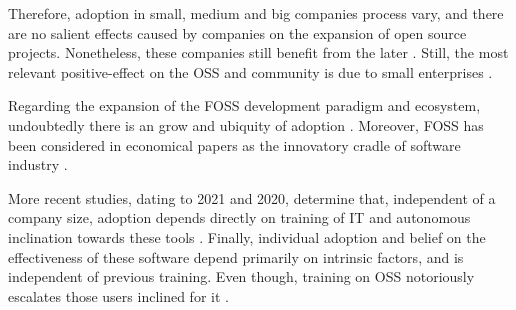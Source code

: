 \documentclass[
12pt,				%
openright,			%
oneside,			%
a4paper,			%
brazil,				%
english,			%
]{abntex2}
\begin{document}

Therefore, adoption in small, medium and big companies process vary,
and there are no salient effects caused by companies on the expansion
of open source projects. Nonetheless, these companies still benefit
from the later \cite{spinellis2012organizational,hauge2008adoption,
  fitzgerald2006transformation}. Still, the most relevant positive-effect on
the OSS and community is due to small enterprises \cite{kshetri2004economics}.  

Regarding the expansion of the FOSS development paradigm and
ecosystem, undoubtedly there is an grow and ubiquity of adoption
\cite{schimidt2016agile}. Moreover, FOSS has been considered in
economical papers as the innovatory cradle of software industry \cite{schrape2019open,schmidt2016agile}.


More recent studies, dating to 2021 and 2020, determine that,
independent of a company size, adoption depends directly on training
of IT and autonomous inclination towards these tools
\cite{racero2020predicting}. Finally, individual adoption and belief
on the effectiveness of these software depend primarily on intrinsic
factors, and is independent of previous training. Even though,
training on OSS notoriously escalates those users inclined for it \cite{racero2021can}.       
\end{document}

